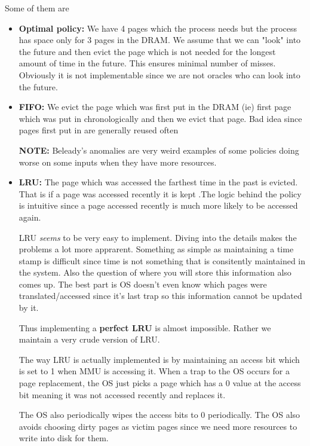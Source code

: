 \documentclass[12pt]{article}
\begin{document}
Some of them are
\begin{itemize}[topsep=0pt]        
    \item \textbf{Optimal policy:} We have 4 pages which the process needs but the process has space only for 3 pages in the DRAM. We assume that we can "look" into the future 
    and then evict the page which is not needed for the longest amount of time in the future. This ensures minimal number of misses. Obviously it is not implementable since we are not oracles
    who can look into the future.
    \item \textbf{FIFO:} We evict the page which was first put in the DRAM (ie) first page which was put in chronologically and then we evict that page. Bad idea since pages first put in are generally reused often
    
    \textbf{NOTE:} Beleady's anomalies are very weird examples of some policies doing worse on some inputs when they have more resources.
    
    \item \textbf{LRU:} The page which was accessed the farthest time in the past is evicted. That is if a page was accessed recently it is kept
    .The logic behind the policy is intuitive since a page accessed recently is much more likely to be accessed again.

    LRU \textit{seems} to be very easy to implement. Diving into the details makes the problems a lot more apprarent. Something as simple as maintaining a time stamp is difficult since 
    time is not something that is consitently maintained in the system. Also the question of where you will store this information also comes up. The best part is OS doesn't even know
    which pages were translated/accessed since it's last trap so this information cannot be updated by it. 

    Thus implementing a \textbf{perfect LRU} is almost impossible. Rather we maintain a very crude version of LRU.

    The way LRU is actually implemented is by maintaining an access bit which is set to 1 when MMU is accessing it. When a trap to the OS
    occurs for a page replacement, the OS just picks a page which has a 0 value at the access bit meaning it was not accessed recently and replaces it.

    The OS also periodically wipes the access bits to 0 periodically. The OS also avoids choosing dirty pages as victim pages since we need more resources to write 
    into disk for them. 
\end{itemize}
\end{document}
